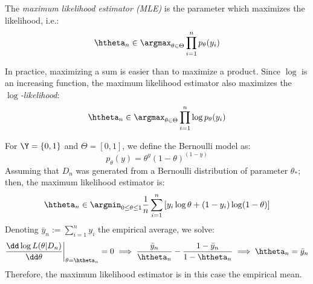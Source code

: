 \documentclass[toc, titlepaged]{../cs-classes/cs-classes}
\begin{document}
\begin{definition}
    The \emph{maximum likelihood estimator (MLE)} is the parameter which maximizes the likelihood, i.e.:
    \begin{equation}
        \htheta_n\in\argmax_{\theta\in\Theta} \prod_{i=1}^n p_\theta(y_i)
    \end{equation}
\end{definition}

In practice, maximizing a sum is easier than to maximize a product. Since $\log$ is an increasing function, the maximum likelihood estimator also maximizes the \emph{$\log$-likelihood}:
\begin{equation}
    \htheta_n\in\argmax_{\theta\in\Theta} \prod_{i=1}^n \log p_\theta(y_i)
\end{equation}

\begin{example}
    For $\Y=\{0, 1\}$ and $\Theta=[0, 1]$, we define the Bernoulli model as:
    \begin{equation*}
        p_\theta(y) = \theta^y(1-\theta)^{(1-y)}
    \end{equation*}
    Assuming that $D_n$ was generated from a Bernoulli distribution of parameter $\theta_*$; then, the maximum likelihood estimator is:
    \begin{equation*}
        \htheta_n\in\argmin_{0\leq\theta\leq1} \frac{1}{n} \sum_{i=1}^n \left[y_i\log\theta + (1-y_i)\log(1-\theta)\right]
    \end{equation*}
    Denoting $\bar{y}_n := \sum_{i=1}^ny_i$ the empirical average, we solve:
    \begin{equation*}
        \frac{\dd\log L(\theta|D_n)}{\dd\theta} \biggr\rvert_{\theta=\htheta_n} = 0 \implies \frac{\bar{y}_n}{\htheta_n} - \frac{1-\bar{y}_n}{1-\htheta_n} \implies \htheta_n = \bar{y}_n
    \end{equation*} 
    Therefore, the maximum likelihood estimator is in this case the empirical mean.
\end{example}
\end{document}
